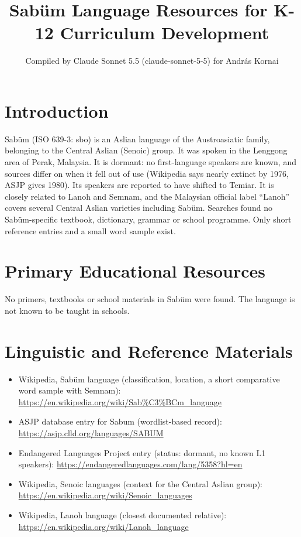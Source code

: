 \documentclass[12pt]{article}
\title{Sab\"um Language Resources for K-12 Curriculum Development}
\author{Compiled by Claude Sonnet 5.5 (claude-sonnet-5-5) for Andr\'as Kornai}
\date{}
\begin{document}
\maketitle

\section{Introduction}
Sab\"um (ISO 639-3: sbo) is an Aslian language of the Austroasiatic family, belonging to the Central Aslian (Senoic) group. It was spoken in the Lenggong area of Perak, Malaysia. It is dormant: no first-language speakers are known, and sources differ on when it fell out of use (Wikipedia says nearly extinct by 1976, ASJP gives 1980). Its speakers are reported to have shifted to Temiar. It is closely related to Lanoh and Semnam, and the Malaysian official label ``Lanoh'' covers several Central Aslian varieties including Sab\"um. Searches found no Sab\"um-specific textbook, dictionary, grammar or school programme. Only short reference entries and a small word sample exist.

\section{Primary Educational Resources}
No primers, textbooks or school materials in Sab\"um were found. The language is not known to be taught in schools.

\section{Linguistic and Reference Materials}
\begin{itemize}
\item Wikipedia, Sab\"um language (classification, location, a short comparative word sample with Semnam): \url{https://en.wikipedia.org/wiki/Sab%C3%BCm_language}
\item ASJP database entry for Sabum (wordlist-based record): \url{https://asjp.clld.org/languages/SABUM}
\item Endangered Languages Project entry (status: dormant, no known L1 speakers): \url{https://endangeredlanguages.com/lang/5358?hl=en}
\item Wikipedia, Senoic languages (context for the Central Aslian group): \url{https://en.wikipedia.org/wiki/Senoic_languages}
\item Wikipedia, Lanoh language (closest documented relative): \url{https://en.wikipedia.org/wiki/Lanoh_language}
\end{itemize}
\end{document}
